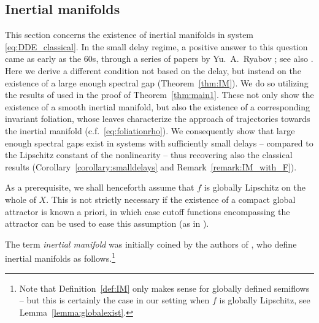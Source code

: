 \documentclass[a4paper, 12pt, oneside, reqno, notitlepage]{amsart}
\theoremstyle{plain}
\theoremstyle{definition}
\theoremstyle{remark}
\begin{document}
\subsection{Inertial manifolds}
\label{sect:IM_statement}


This section concerns the existence of inertial manifolds in system \eqref{eq:DDE_classical}. 
In the small delay regime, a positive answer to this question came as early as the 60s, through a series of papers by Yu.\ A.\ Ryabov \cite{ryabov1960application,ryabov1960application2,ryabov1961application,ryabov1963certain}; see also \cite{driver1968ryabov,driver1976linear,chicone2003inertial}.
Here we derive a different condition not based on the delay, but instead on the existence of a large enough spectral gap (Theorem~\ref{thm:IM}).
We do so utilizing the results of \cite{chen1997invariant} used in the proof of Theorem~\ref{thm:main1}.
These not only show the existence of a smooth inertial manifold, but also the existence of a corresponding invariant foliation, whose leaves characterize the approach of trajectories towards the inertial manifold (c.f.\ \eqref{eq:foliationrho}).
We consequently show that large enough spectral gaps exist in systems with sufficiently small delays -- compared to the Lipschitz constant of the nonlinearity -- thus recovering also the classical results (Corollary~\ref{corollary:smalldelays} and Remark~\ref{remark:IM_with_F}). 



As a prerequisite, we shall henceforth assume that $f$ is globally Lipschitz on the whole of $X$.
This is not strictly necessary if the existence of a compact global attractor is known a priori, in which case cutoff functions encompassing the attractor can be used to ease this assumption (as in \cite{foias1988inertial}).

The term \textit{inertial manifold} was initially coined by the authors of \cite{foias1988inertial}, who define inertial manifolds as follows.\footnote{Note that Definition~\ref{def:IM} only makes sense for globally defined semiflows -- but this is certainly the case in our setting when $f$ is globally Lipschitz, see Lemma~\ref{lemma:globalexist}.}
\end{document}
